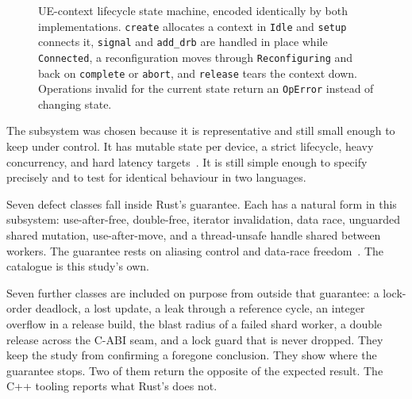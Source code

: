 \documentclass[english,twoside,openright,a4paper,censored,csm,software-track-2020]{HYthesisML}
\begin{document}
\begin{figure}[ht]
\centering
{}
\caption[UE-context lifecycle state machine]{UE-context lifecycle state machine, encoded identically by both implementations.
\texttt{create} allocates a context in \texttt{Idle} and \texttt{setup} connects it,
\texttt{signal} and \texttt{add\_drb} are handled in place while \texttt{Connected}, a
reconfiguration moves through \texttt{Reconfiguring} and back on \texttt{complete} or
\texttt{abort}, and \texttt{release} tears the context down. Operations invalid for the
current state return an \texttt{OpError} instead of changing state.\label{fig:fsm}}
\end{figure}

The subsystem was chosen because it is representative and still small enough to keep
under control. It has mutable state per device, a strict lifecycle, heavy concurrency,
and hard latency targets~\cite{3gpp38913,3gpp22261}. It is still simple enough to specify
precisely and to test for identical behaviour in two languages.

Seven defect classes fall inside Rust's guarantee. Each has a natural form in this
subsystem: use-after-free, double-free, iterator invalidation, data race, unguarded
shared mutation, use-after-move, and a thread-unsafe handle shared between workers. The
guarantee rests on aliasing control and data-race freedom~\cite{jung2021safe}. The
catalogue is this study's own.

Seven further classes are included on purpose from outside that guarantee: a lock-order
deadlock, a lost update, a leak through a reference cycle, an integer overflow in a
release build, the blast radius of a failed shard worker, a double release across the
C-ABI seam, and a lock guard that is never dropped. They keep the study from confirming a
foregone conclusion. They show where the guarantee stops. Two of them return the opposite
of the expected result. The C++ tooling reports what Rust's does not.
\end{document}
